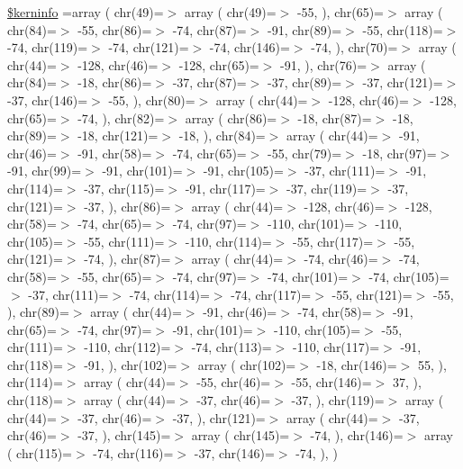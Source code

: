 \begin{DoxyCompactItemize}
\hyperlink{ctimesbi_8php_ab4bb7d3b0332c517f6a42a1924f01000}{\$kerninfo} =array ( chr(49)=$>$ array ( chr(49)=$>$ -\/55, ), chr(65)=$>$ array ( chr(84)=$>$ -\/55, chr(86)=$>$ -\/74, chr(87)=$>$ -\/91, chr(89)=$>$ -\/55, chr(118)=$>$ -\/74, chr(119)=$>$ -\/74, chr(121)=$>$ -\/74, chr(146)=$>$ -\/74, ), chr(70)=$>$ array ( chr(44)=$>$ -\/128, chr(46)=$>$ -\/128, chr(65)=$>$ -\/91, ), chr(76)=$>$ array ( chr(84)=$>$ -\/18, chr(86)=$>$ -\/37, chr(87)=$>$ -\/37, chr(89)=$>$ -\/37, chr(121)=$>$ -\/37, chr(146)=$>$ -\/55, ), chr(80)=$>$ array ( chr(44)=$>$ -\/128, chr(46)=$>$ -\/128, chr(65)=$>$ -\/74, ), chr(82)=$>$ array ( chr(86)=$>$ -\/18, chr(87)=$>$ -\/18, chr(89)=$>$ -\/18, chr(121)=$>$ -\/18, ), chr(84)=$>$ array ( chr(44)=$>$ -\/91, chr(46)=$>$ -\/91, chr(58)=$>$ -\/74, chr(65)=$>$ -\/55, chr(79)=$>$ -\/18, chr(97)=$>$ -\/91, chr(99)=$>$ -\/91, chr(101)=$>$ -\/91, chr(105)=$>$ -\/37, chr(111)=$>$ -\/91, chr(114)=$>$ -\/37, chr(115)=$>$ -\/91, chr(117)=$>$ -\/37, chr(119)=$>$ -\/37, chr(121)=$>$ -\/37, ), chr(86)=$>$ array ( chr(44)=$>$ -\/128, chr(46)=$>$ -\/128, chr(58)=$>$ -\/74, chr(65)=$>$ -\/74, chr(97)=$>$ -\/110, chr(101)=$>$ -\/110, chr(105)=$>$ -\/55, chr(111)=$>$ -\/110, chr(114)=$>$ -\/55, chr(117)=$>$ -\/55, chr(121)=$>$ -\/74, ), chr(87)=$>$ array ( chr(44)=$>$ -\/74, chr(46)=$>$ -\/74, chr(58)=$>$ -\/55, chr(65)=$>$ -\/74, chr(97)=$>$ -\/74, chr(101)=$>$ -\/74, chr(105)=$>$ -\/37, chr(111)=$>$ -\/74, chr(114)=$>$ -\/74, chr(117)=$>$ -\/55, chr(121)=$>$ -\/55, ), chr(89)=$>$ array ( chr(44)=$>$ -\/91, chr(46)=$>$ -\/74, chr(58)=$>$ -\/91, chr(65)=$>$ -\/74, chr(97)=$>$ -\/91, chr(101)=$>$ -\/110, chr(105)=$>$ -\/55, chr(111)=$>$ -\/110, chr(112)=$>$ -\/74, chr(113)=$>$ -\/110, chr(117)=$>$ -\/91, chr(118)=$>$ -\/91, ), chr(102)=$>$ array ( chr(102)=$>$ -\/18, chr(146)=$>$ 55, ), chr(114)=$>$ array ( chr(44)=$>$ -\/55, chr(46)=$>$ -\/55, chr(146)=$>$ 37, ), chr(118)=$>$ array ( chr(44)=$>$ -\/37, chr(46)=$>$ -\/37, ), chr(119)=$>$ array ( chr(44)=$>$ -\/37, chr(46)=$>$ -\/37, ), chr(121)=$>$ array ( chr(44)=$>$ -\/37, chr(46)=$>$ -\/37, ), chr(145)=$>$ array ( chr(145)=$>$ -\/74, ), chr(146)=$>$ array ( chr(115)=$>$ -\/74, chr(116)=$>$ -\/37, chr(146)=$>$ -\/74, ), )
\end{DoxyCompactItemize}


